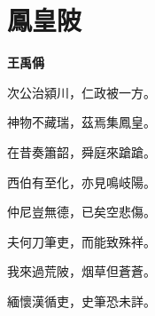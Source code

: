 \documentclass[12pt,a4paper]{ctexbook}
\begin{document}
\section{鳳皇陂}
\textbf{王禹偁}\par\vspace{0.5em}
次公治潁川，仁政被一方。\par
神物不藏瑞，茲焉集鳳皇。\par
在昔奏簫韶，舜庭來蹌蹌。\par
西伯有至化，亦見鳴岐陽。\par
仲尼豈無德，已矣空悲傷。\par
夫何刀筆吏，而能致殊祥。\par
我來過荒陂，烟草但蒼蒼。\par
緬懷漢循吏，史筆恐未詳。\par
\end{document}
